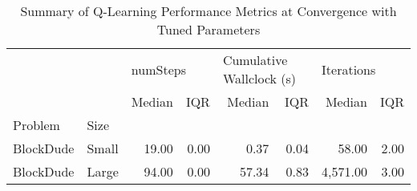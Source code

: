 \documentclass{article}
\begin{document}
\begin{table}
    \centering
    \caption{Summary of Q-Learning Performance Metrics at Convergence with Tuned Parameters}
    \label{table:large-bd-ql}
    \begin{tabular}{llrrrrrr}
        \toprule
           &     & \multicolumn{2}{l}{numSteps} & \multicolumn{2}{l}{Cumulative Wallclock (s)} & \multicolumn{2}{l}{Iterations} \\
           &     &   Median &  IQR &           Median &    IQR &    Median &   IQR \\
        Problem & Size &          &      &                  &        &           &       \\
        \midrule
        BlockDude & Small &    19.00 & 0.00 &         0.37 &  0.04  &     58.00 &  2.00 \\
        BlockDude & Large &    94.00 & 0.00 &         57.34 &  0.83 &  4,571.00 &  3.00 \\
        \bottomrule
        \end{tabular}               
    \end{table} 
    


    {}

\end{document}
